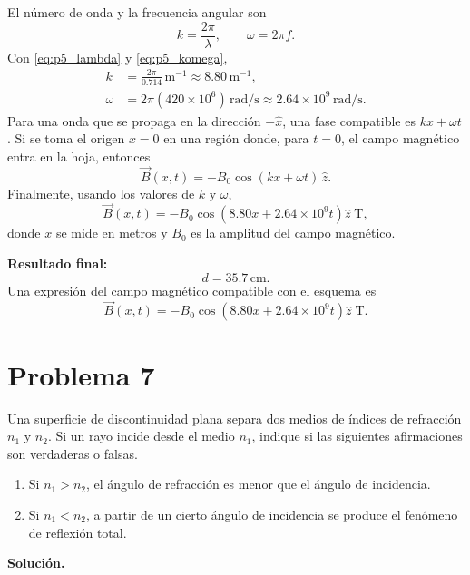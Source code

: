 \documentclass[11pt]{article}
\newcommand{\soluciontitulo}{%
    \par\medskip
    \noindent\textbf{Soluci\'on.}\par
    \smallskip
}
\newcommand{\resultadofinal}[1]{%
    \par\medskip
    \noindent\textbf{Resultado final:} #1\par
}
\newcommand{\problematitulo}[1]{%
    \clearpage
    \section*{Problema #1}
    \setcounter{equation}{0}
    \renewcommand{\theequation}{#1.\arabic{equation}}
    \renewcommand{\theHequation}{#1.\arabic{equation}}
}
\begin{document}
El n\'umero de onda y la frecuencia angular son
\begin{equation}
    k=\frac{2\pi}{\lambda},
    \qquad
    \omega=2\pi f.
    \label{eq:p5_komega}
\end{equation}
Con \eqref{eq:p5_lambda} y \eqref{eq:p5_komega},
\begin{align*}
    k&=\frac{2\pi}{0.714}\,\mathrm{m^{-1}}\approx8.80\,\mathrm{m^{-1}},\\
    \omega&=2\pi(420\times10^6)\,\mathrm{rad/s}\approx2.64\times10^9\,\mathrm{rad/s}.
\end{align*}
Para una onda que se propaga en la direcci\'on $-\hat{x}$, una fase compatible es $kx+\omega t$. Si se toma el origen $x=0$ en una regi\'on donde, para $t=0$, el campo magn\'etico entra en la hoja, entonces
\begin{equation}
    \vec B(x,t)=-B_0\cos(kx+\omega t)\,\hat{z}.
    \label{eq:p5_B}
\end{equation}
Finalmente, usando los valores de $k$ y $\omega$,
\begin{equation*}
    \vec B(x,t)=-B_0\cos\!\left(8.80x+2.64\times10^9t\right)\hat{z}\;\mathrm{T},
\end{equation*}
donde $x$ se mide en metros y $B_0$ es la amplitud del campo magn\'etico.

\resultadofinal{%
\begin{equation*}
    \boxed{d=35.7\,\mathrm{cm}}.
\end{equation*}
Una expresi\'on del campo magn\'etico compatible con el esquema es
\begin{equation*}
    \boxed{\vec B(x,t)=-B_0\cos\!\left(8.80x+2.64\times10^9t\right)\hat{z}\;\mathrm{T}}.
\end{equation*}}

\problematitulo{7}

Una superficie de discontinuidad plana separa dos medios de \'indices de refracci\'on $n_1$ y $n_2$. Si un rayo incide desde el medio $n_1$, indique si las siguientes afirmaciones son verdaderas o falsas.

\begin{enumerate}[label=(\alph*)]
    \item Si $n_1>n_2$, el \'angulo de refracci\'on es menor que el \'angulo de incidencia.
    \item Si $n_1<n_2$, a partir de un cierto \'angulo de incidencia se produce el fen\'omeno de reflexi\'on total.
\end{enumerate}

\soluciontitulo
\end{document}
